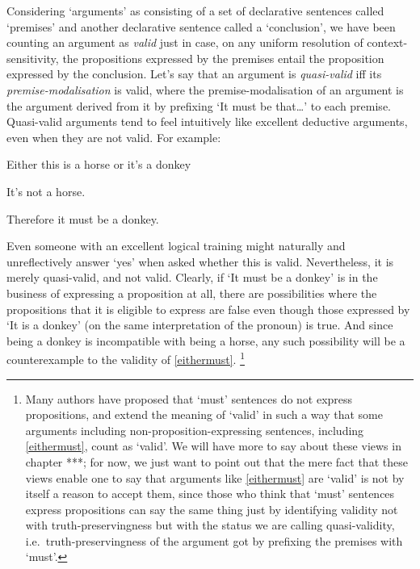 \documentclass[If.tex]{subfiles}
\begin{document}
Considering ‘arguments’ as consisting of a set of declarative sentences called ‘premises’ and another declarative sentence called a ‘conclusion’, we have been counting an argument as \emph{valid} just in case, on any uniform resolution of context-sensitivity, the propositions expressed by the premises entail the proposition expressed by the conclusion.  Let's say that an argument is \emph{quasi-valid} iff its \emph{premise-modalisation} is valid, where the premise-modalisation of an argument is the argument derived from it by prefixing ‘It must be that\ldots{}’ to each premise.  Quasi-valid arguments tend to feel intuitively like excellent deductive arguments, even when they are not valid. For example:
\begin{prop}
	\nitem \label{eithermust}
		Either this is a horse or it's a donkey

		It's not a horse.

		Therefore it must be a donkey.
\end{prop}
Even someone with an excellent logical training might naturally and unreflectively answer ‘yes’ when asked whether this is valid.  Nevertheless, it is merely quasi-valid, and not valid.  Clearly, if ‘It must be a donkey’ is in the business of expressing a proposition at all, there are possibilities where the propositions that it is eligible to express are false even though those expressed by ‘It is a donkey’ (on the same interpretation of the pronoun) is true.  And since being a donkey is incompatible with being a horse, any such possibility will be a counterexample to the validity of \ref{eithermust}.%
\footnote{Many authors have proposed that ‘must’ sentences do not express propositions, and extend the meaning of ‘valid’ in such a way that some arguments including non-proposition-expressing sentences, including \ref{eithermust}, count as ‘valid’.  We will have more to say about these views in chapter ***; for now, we just want to point out that the mere fact that these views enable one to say that arguments like \ref{eithermust} are ‘valid’ is not by itself a reason to accept them, since those who think that ‘must’ sentences express propositions can say the same thing just by identifying validity not with truth-preservingness but with the status we are calling quasi-validity, i.e.\ truth-preservingness of the argument got by prefixing the premises with ‘must’.}
\end{document}
